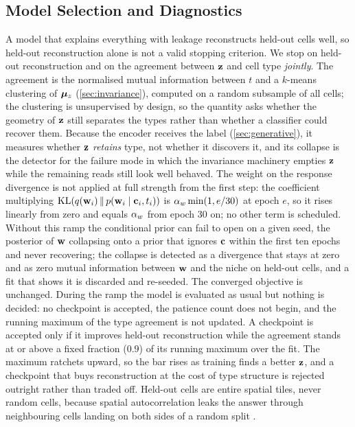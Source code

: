 \subsection{Model Selection and Diagnostics}
\label{sec:selection}

 A model that explains everything with leakage reconstructs held-out cells well, so held-out reconstruction alone is not a valid stopping criterion. We stop on held-out reconstruction and on the agreement between $\mathbf{z}$ and cell type \emph{jointly}. The agreement is the normalised mutual information between $t$ and a $k$-means clustering of $\boldsymbol{\mu}_z$ (\cref{sec:invariance}), computed on a random subsample of all cells; the clustering is unsupervised by design, so the quantity asks whether the geometry of $\mathbf{z}$ still separates the types rather than whether a classifier could recover them. Because the encoder receives the label (\cref{sec:generative}), it measures whether $\mathbf{z}$ \emph{retains} type, not whether it discovers it, and its collapse is the detector for the failure mode in which the invariance machinery empties $\mathbf{z}$ while the remaining reads still look well behaved. The weight on the response divergence is not applied at full strength from the first step: the coefficient multiplying $\operatorname{KL}(q(\mathbf{w}_i)\,\|\,p(\mathbf{w}_i \mid \mathbf{c}_i, t_i))$ is $\alpha_w \min(1, e/30)$ at epoch $e$, so it rises linearly from zero and equals $\alpha_w$ from epoch $30$ on; no other term is scheduled. Without this ramp the conditional prior can fail to open on a given seed, the posterior of $\mathbf{w}$ collapsing onto a prior that ignores $\mathbf{c}$ within the first ten epochs and never recovering; the collapse is detected as a divergence that stays at zero and as zero mutual information between $\mathbf{w}$ and the niche on held-out cells, and a fit that shows it is discarded and re-seeded. The converged objective is unchanged. During the ramp the model is evaluated as usual but nothing is decided: no checkpoint is accepted, the patience count does not begin, and the running maximum of the type agreement is not updated. A checkpoint is accepted only if it improves held-out reconstruction while the agreement stands at or above a fixed fraction ($0.9$) of its running maximum over the fit. The maximum ratchets upward, so the bar rises as training finds a better $\mathbf{z}$, and a checkpoint that buys reconstruction at the cost of type structure is rejected outright rather than traded off. Held-out cells are entire spatial tiles, never random cells, because spatial autocorrelation leaks the answer through neighbouring cells landing on both sides of a random split \citep{roberts2017}.

